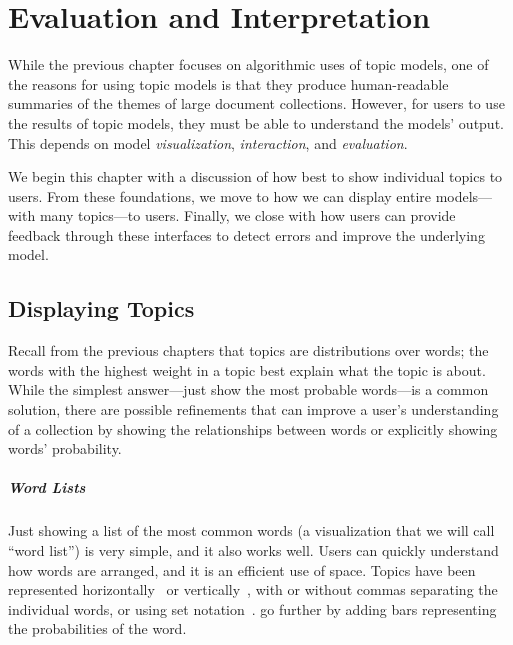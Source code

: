 \chapter{Evaluation and Interpretation}
\label{ch:viz}

While the previous chapter focuses on algorithmic uses of topic
models, one of the reasons for using topic models is that they produce
human-readable summaries of the themes of large document collections.  However,
for users to use the results of topic models, they must be able to understand
the models' output.  This depends on model \emph{visualization},
\emph{interaction}, and \emph{evaluation}.

We begin this chapter with a discussion of how best to show individual
topics to users.  From these foundations, we move to how we can
display entire models---with many topics---to users.  Finally, we
close with how users can provide feedback through these interfaces to
detect errors and improve the underlying model.

\section{Displaying Topics}
\label{sec:display}

Recall from the previous chapters that topics are distributions over words; the
words with the highest weight in a topic best explain what the topic is about.
While the simplest answer---just show the most probable words---is a common
solution, there are possible refinements that can improve a user's understanding
of a collection by showing the relationships between words or explicitly showing
words' probability.

\paragraph{Word Lists}

Just showing a list of the most common words (a
visualization that we will call ``word list'') is very simple, and it also works well.
Users can quickly understand how words are arranged, and it is an efficient use of
space. 
Topics have been represented horizontally~\citep{gardner2010topic,smith2015visual} or
vertically~\citep{eisenstein2012topicviz,chaney-12}, with or without
commas separating the individual words, or using set
notation~\citep{chaney-12}.  \citet{smith2015visual} go further by
adding bars representing the probabilities of the word.

